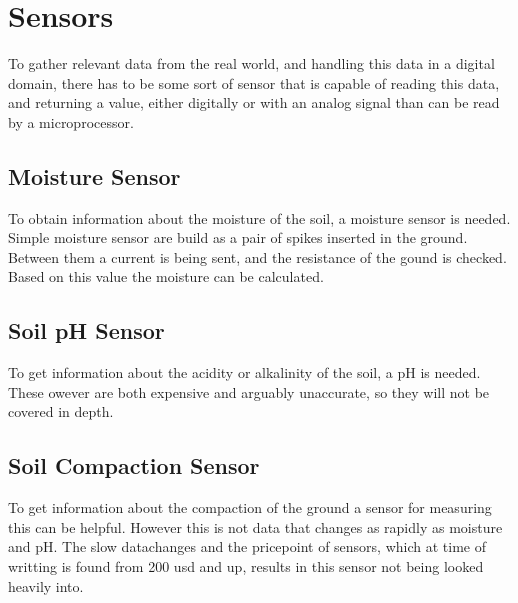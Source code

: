 \section{Sensors}
To gather relevant data from the real world, and handling this data in a digital domain, there has to be some sort of sensor that is capable of reading this data, and returning a value, either digitally or with an analog signal than can be read by a microprocessor.

\subsection{Moisture Sensor}
To obtain information about the moisture of the soil, a moisture sensor is needed. Simple moisture sensor are build as a pair of spikes inserted in the ground. Between them a current is being sent, and the resistance of the gound is checked. Based on this value the moisture can be calculated. %

\subsection{Soil pH Sensor}
To get information about the acidity or alkalinity of the soil, a pH is needed. These owever are both expensive and arguably unaccurate, so they will not be covered in depth. 

\subsection {Soil Compaction Sensor}
To get information about the compaction of the ground a sensor for measuring this can be helpful. However this is not data that changes as rapidly as moisture and pH. The slow datachanges and the pricepoint of sensors, which at time of writting is found from 200 usd and up, results in this sensor not being looked heavily into.
